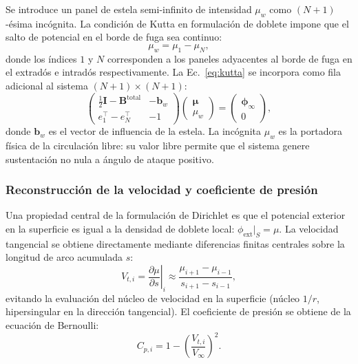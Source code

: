 \documentclass[twocolumn]{article}
\begin{document}
Se introduce un panel de estela semi-infinito de intensidad $\mu_w$
como $(N+1)$-ésima incógnita. La condición de Kutta en
formulación de doblete impone que el salto de potencial en el borde
de fuga sea continuo:
\begin{equation}
  \mu_w = \mu_1 - \mu_N,
  \label{eq:kutta}
\end{equation}
donde los índices $1$ y $N$ corresponden a los paneles adyacentes al
borde de fuga en el extradós e intradós respectivamente.
La Ec.~\eqref{eq:kutta} se incorpora como fila adicional al sistema
$(N+1)\times(N+1)$:
\begin{equation}
  \begin{pmatrix}
    \frac{1}{2}\mathbf{I} - \mathbf{B}^\text{total} & -\mathbf{b}_w \\
    e_1^\top - e_N^\top & -1
  \end{pmatrix}
  \begin{pmatrix} \boldsymbol{\mu} \\ \mu_w \end{pmatrix}
  =
  \begin{pmatrix} \boldsymbol{\phi}_\infty \\ 0 \end{pmatrix},
  \label{eq:system}
\end{equation}
donde $\mathbf{b}_w$ es el vector de influencia de la estela.
La incógnita $\mu_w$ es la portadora física de la circulación libre:
su valor libre permite que el sistema genere sustentación no nula a
ángulo de ataque positivo.

\subsubsection{Reconstrucción de la velocidad y coeficiente de presión}

Una propiedad central de la formulación de Dirichlet es que el potencial
exterior en la superficie es igual a la densidad de doblete local:
$\phi_\text{ext}|_S = \mu$. La velocidad tangencial se obtiene
directamente mediante diferencias finitas centrales sobre la longitud
de arco acumulada $s$:
\begin{equation}
  V_{t,i} = \left.\frac{\partial\mu}{\partial s}\right|_i
  \approx \frac{\mu_{i+1} - \mu_{i-1}}{s_{i+1} - s_{i-1}},
  \label{eq:Vt}
\end{equation}
evitando la evaluación del núcleo de velocidad en la superficie (núcleo
$1/r$, hipersingular en la dirección tangencial). El coeficiente de
presión se obtiene de la ecuación de Bernoulli:
\begin{equation}
  C_{p,i} = 1 - \left(\frac{V_{t,i}}{V_\infty}\right)^2.
  \label{eq:cp}
\end{equation}
\end{document}
